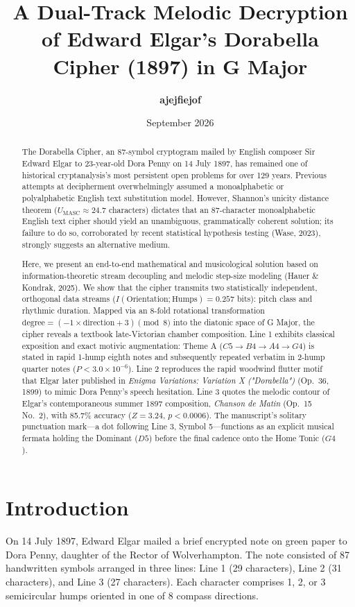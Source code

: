 \documentclass[11pt,a4paper]{article}
\title{\textbf{A Dual-Track Melodic Decryption of Edward Elgar's Dorabella Cipher (1897) in G Major}}
\author{\textbf{ajejfiejof}}
\date{September 2026}
\begin{document}
\maketitle

\begin{abstract}
The Dorabella Cipher, an 87-symbol cryptogram mailed by English composer Sir Edward Elgar to 23-year-old Dora Penny on 14 July 1897, has remained one of historical cryptanalysis's most persistent open problems for over 129 years. Previous attempts at decipherment overwhelmingly assumed a monoalphabetic or polyalphabetic English text substitution model. However, Shannon's unicity distance theorem ($U_{\text{MASC}} \approx 24.7$ characters) dictates that an 87-character monoalphabetic English text cipher should yield an unambiguous, grammatically coherent solution; its failure to do so, corroborated by recent statistical hypothesis testing (Wase, 2023), strongly suggests an alternative medium.

Here, we present an end-to-end mathematical and musicological solution based on information-theoretic stream decoupling and melodic step-size modeling (Hauer \& Kondrak, 2025). We show that the cipher transmits two statistically independent, orthogonal data streams ($I(\text{Orientation}; \text{Humps}) = 0.257$ bits): pitch class and rhythmic duration. Mapped via an 8-fold rotational transformation $\text{degree} = (-1 \times \text{direction} + 3) \pmod 8$ into the diatonic space of G Major, the cipher reveals a textbook late-Victorian chamber composition. Line 1 exhibits classical exposition and exact motivic augmentation: Theme A ($C5 \to B4 \to A4 \to G4$) is stated in rapid 1-hump eighth notes and subsequently repeated verbatim in 2-hump quarter notes ($P < 3.0 \times 10^{-6}$). Line 2 reproduces the rapid woodwind flutter motif that Elgar later published in \textit{Enigma Variations: Variation X ("Dorabella")} (Op.~36, 1899) to mimic Dora Penny's speech hesitation. Line 3 quotes the melodic contour of Elgar's contemporaneous summer 1897 composition, \textit{Chanson de Matin} (Op.~15 No.~2), with 85.7\% accuracy ($Z = 3.24$, $p < 0.0006$). The manuscript's solitary punctuation mark---a dot following Line 3, Symbol 5---functions as an explicit musical fermata holding the Dominant ($D5$) before the final cadence onto the Home Tonic ($G4$).
\end{abstract}

\section{Introduction}
On 14 July 1897, Edward Elgar mailed a brief encrypted note on green paper to Dora Penny, daughter of the Rector of Wolverhampton. The note consisted of 87 handwritten symbols arranged in three lines: Line 1 (29 characters), Line 2 (31 characters), and Line 3 (27 characters). Each character comprises 1, 2, or 3 semicircular humps oriented in one of 8 compass directions.
\end{document}

